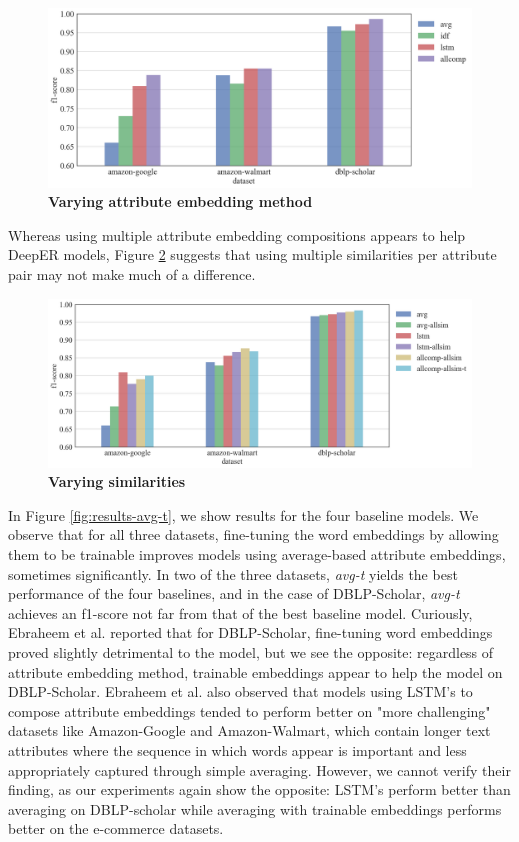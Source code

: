 \documentclass{proc}
\begin{document}
\begin{figure}
	\includegraphics[scale=0.22]{../imgs/results-compositions.png}
	\caption{\textbf{Varying attribute embedding method}}
	\label{fig:results-compositions}
\end{figure}

Whereas using multiple attribute embedding compositions appears to help DeepER models, Figure \ref{fig:results-similarities} suggests that using multiple similarities per attribute pair may not make much of a difference. 

\begin{figure}
	\includegraphics[scale=0.22]{../imgs/results-similarities.png}
	\caption{\textbf{Varying similarities}}
	\label{fig:results-similarities}
\end{figure}

In Figure \ref{fig:results-avg-t}, we show results for the four baseline models. We observe that for all three datasets, fine-tuning the word embeddings by allowing them to be trainable improves models using average-based attribute embeddings, sometimes significantly. In two of the three datasets, \textit{avg-t} yields the best performance of the four baselines, and in the case of DBLP-Scholar, \textit{avg-t} achieves an f1-score not far from that of the best baseline model. Curiously, Ebraheem et al. \cite{ebraheem-deep-er} reported that for DBLP-Scholar, fine-tuning word embeddings proved slightly detrimental to the model, but we see the opposite: regardless of attribute embedding method, trainable embeddings appear to help the model on DBLP-Scholar. Ebraheem et al. \cite{ebraheem-deep-er} also observed that models using LSTM's to compose attribute embeddings tended to perform better on "more challenging" datasets like Amazon-Google and Amazon-Walmart, which contain longer text attributes where the sequence in which words appear is important and less appropriately captured through simple averaging. However, we cannot verify their finding, as our experiments again show the opposite: LSTM's perform better than averaging on DBLP-scholar while averaging with trainable embeddings performs better on the e-commerce datasets.
\end{document}

